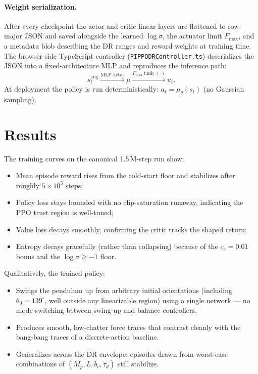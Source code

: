 \documentclass[11pt,a4paper]{article}
\begin{document}
\paragraph{Weight serialization.}
After every checkpoint the actor and critic linear layers are flattened to row-major JSON and saved alongside the learned $\log\sigma$, the actuator limit $F_{\max}$, and a metadata blob describing the DR ranges and reward weights at training time. The browser-side TypeScript controller (\texttt{PIPPODRController.ts}) deserializes the JSON into a fixed-architecture MLP and reproduces the inference path:
\begin{equation*}
s^{\text{aug}}_t \xrightarrow{\text{MLP actor}} \mu \xrightarrow{F_{\max}\tanh(\cdot)} u_t.
\end{equation*}
At deployment the policy is run deterministically: $a_t = \mu_\theta(s_t)$ (no Gaussian sampling).

\section{Results}

The training curves on the canonical 1.5\,M-step run show:
\begin{itemize}[leftmargin=*]
\item Mean episode reward rises from the cold-start floor and stabilizes after roughly $5\times 10^5$ steps;
\item Policy loss stays bounded with no clip-saturation runaway, indicating the PPO trust region is well-tuned;
\item Value loss decays smoothly, confirming the critic tracks the shaped return;
\item Entropy decays gracefully (rather than collapsing) because of the $c_e = 0.01$ bonus and the $\log\sigma \geq -1$ floor.
\end{itemize}

\noindent Qualitatively, the trained policy:
\begin{itemize}[leftmargin=*]
\item Swings the pendulum up from arbitrary initial orientations (including $\theta_0 = 139^\circ$, well outside any linearizable region) using a single network --- no mode switching between swing-up and balance controllers.
\item Produces smooth, low-chatter force traces that contrast cleanly with the bang-bang traces of a discrete-action baseline.
\item Generalizes across the DR envelope: episodes drawn from worst-case combinations of $(M_p, L, b_c, \tau_d)$ still stabilize.
\end{itemize}
\end{document}
